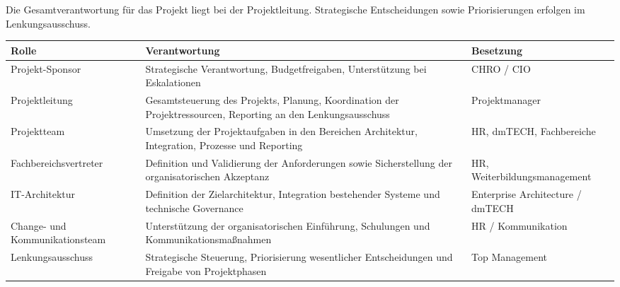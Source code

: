 Die Gesamtverantwortung für das Projekt liegt bei der Projektleitung.
Strategische Entscheidungen sowie Priorisierungen erfolgen im
Lenkungsausschuss.

\begin{tabularx}{\textwidth}{@{}>{\hsize=0.6\hsize}X>{\hsize=1.8\hsize}X>{\hsize=0.6\hsize}X@{}}
    \hline
    \textbf{Rolle}                                                         & \textbf{Verantwortung}                         & \textbf{Besetzung} \\
    \hline
    Projekt-Sponsor                                                        & Strategische Verantwortung, Budgetfreigaben,
    Unterstützung bei Eskalationen                                         & CHRO / CIO                                                          \\
    Projektleitung                                                         & Gesamtsteuerung des Projekts, Planung,
    Koordination der Projektressourcen, Reporting an den Lenkungsausschuss & Projektmanager                                                      \\
    Projektteam                                                            & Umsetzung der Projektaufgaben in den Bereichen
    Architektur, Integration, Prozesse und Reporting                       & HR, dmTECH,
    Fachbereiche                                                                                                                                 \\
    Fachbereichs\-vertreter                                                  & Definition und Validierung der Anforderungen
    sowie Sicherstellung der organisatorischen Akzeptanz                   & HR,
    Weiterbildungsmanagement                                                                                                                     \\
    IT-Architektur                                                         & Definition der Zielarchitektur, Integration
    bestehender Systeme und technische Governance                          & Enterprise Architecture / dmTECH                                    \\
    Change- und Kommunikationsteam                                         & Unterstützung der organisatorischen
    Einführung, Schulungen und Kommunikationsmaßnahmen                     & HR / Kommunikation                                                  \\
    Lenkungsausschuss                                                      & Strategische Steuerung, Priorisierung
    wesentlicher Entscheidungen und Freigabe von Projektphasen             & Top Management                                                      \\
    \hline
\end{tabularx}

